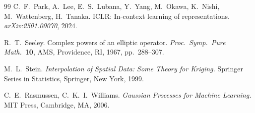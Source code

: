 \begin{thebibliography}{99}
C.~F.\ Park, A.\ Lee, E.~S.\ Lubana, Y.\ Yang, M.\ Okawa, K.\ Nishi,
M.\ Wattenberg, H.\ Tanaka.
ICLR: In-context learning of representations.
\textit{arXiv:2501.00070}, 2024.

R.~T.\ Seeley.
Complex powers of an elliptic operator.
\textit{Proc.\ Symp.\ Pure Math.}\ \textbf{10}, AMS,
Providence, RI, 1967, pp.~288--307.

M.~L.\ Stein.
\textit{Interpolation of Spatial Data: Some Theory for Kriging.}
Springer Series in Statistics, Springer, New York, 1999.

C.~E.\ Rasmussen, C.~K.~I.\ Williams.
\textit{Gaussian Processes for Machine Learning.}
MIT Press, Cambridge, MA, 2006.

\end{thebibliography}


